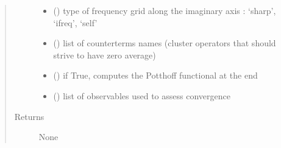 \documentclass[letterpaper,10pt,english]{sphinxmanual}
\begin{document}
\begin{fulllineitems}
\begin{quote}
\begin{description}
\begin{itemize}
\item {} 
\sphinxAtStartPar
{} () \textendash{} type of frequency grid along the imaginary axis : ‘sharp’, ‘ifreq’, ‘self’

\item {} 
\sphinxAtStartPar
{} (\sphinxstyleliteralemphasis{\sphinxupquote{{[}}}\sphinxstyleliteralemphasis{\sphinxupquote{{]}}}) \textendash{} list of counterterms names (cluster operators that should strive to have zero average)

\item {} 
\sphinxAtStartPar
{} () \textendash{} if True, computes the Potthoff functional at the end

\item {} 
\sphinxAtStartPar
{}\sphinxstyleliteralstrong{\sphinxupquote{{]}}} (\sphinxstyleliteralemphasis{\sphinxupquote{{[}}}) \textendash{} list of observables used to assess convergence

\end{itemize}

\item[{Returns}] \leavevmode
\sphinxAtStartPar
None

\end{description}\end{quote}

\end{fulllineitems}

\end{document}
